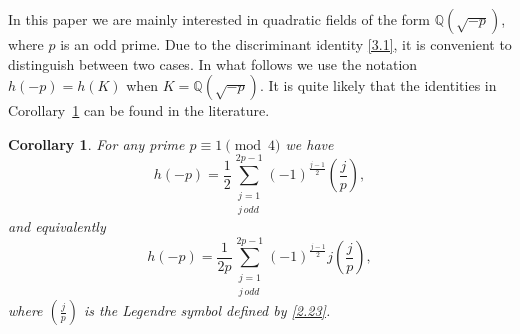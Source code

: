 \documentclass{amsart}
\theoremstyle{plain}
\newtheorem{corollary}[theorem]{Corollary}
\numberwithin{equation}{section}
\begin{document}
In this paper we are mainly interested in quadratic fields of the form
${\mathbb Q}(\sqrt{-p})$, where $p$ is an odd prime. Due to the discriminant
identity \eqref{3.1}, it is convenient to distinguish between two cases. 
In what follows we use the notation $h(-p)=h(K)$ when 
$K={\mathbb Q}(\sqrt{-p})$.
It is quite likely that the identities in Corollary~\ref{cor:3.2} 
can be found in the literature.

\begin{corollary}\label{cor:3.2}
For any prime $p\equiv 1\pmod{4}$ we have
\begin{equation}\label{3.3}
h(-p)=\frac{1}{2}\sum_{\substack{j=1\\j\,odd}}^{2p-1}
(-1)^{\frac{j-1}{2}}\left(\frac{j}{p}\right),
\end{equation}
and equivalently
\begin{equation}\label{3.4}
h(-p)=\frac{1}{2p}\sum_{\substack{j=1\\j\,odd}}^{2p-1}
(-1)^{\frac{j-1}{2}}j\left(\frac{j}{p}\right),
\end{equation}
where $(\frac{j}{p})$ is the Legendre symbol defined by \eqref{2.23}.
\end{corollary}
\end{document}

